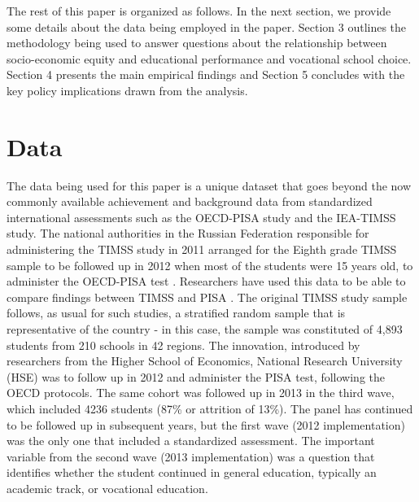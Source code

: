 \documentclass[alpha-refs,fleqn]{wiley-article_p2}
\begin{document}
\noindent The rest of this paper is organized as follows. In the next section, we provide some details about the data being employed in the paper. Section 3 outlines the methodology being used to answer questions about the relationship between socio-economic equity and educational performance and vocational school choice. Section 4 presents the main empirical findings and Section 5 concludes with the key policy implications drawn from the analysis.

\section{Data}

\vspace{-1em}

The data being used for this paper is a unique dataset that goes beyond the now commonly available achievement and background data from standardized international assessments such as the OECD-PISA study and the IEA-TIMSS study. The national authorities in the Russian Federation responsible for administering the TIMSS study in 2011 arranged for the Eighth grade TIMSS sample to  be followed up in 2012 when most of the students were 15 years old, to administer the OECD-PISA test \cite{Bessudnov_14}. Researchers have used this data to be able to compare findings between TIMSS and PISA \cite{Carnoy_2016}. The original TIMSS study sample follows, as usual for such studies, a stratified random sample that is representative of the country - in this case, the sample was constituted of 4,893 students from 210 schools in 42 regions. The innovation, introduced by researchers from the Higher School of Economics, National Research University (HSE) was to follow up in 2012 and administer the PISA test, following the OECD protocols. The same cohort was followed up in 2013 in the third wave, which included 4236 students (87\% or attrition of 13\%). The panel has continued to be followed up in subsequent years, but the first wave (2012 implementation) was the only one that included a standardized assessment. The important variable from the second wave (2013 implementation) was a question that identifies whether the student continued in general education, typically an academic track, or vocational education.
\end{document}
